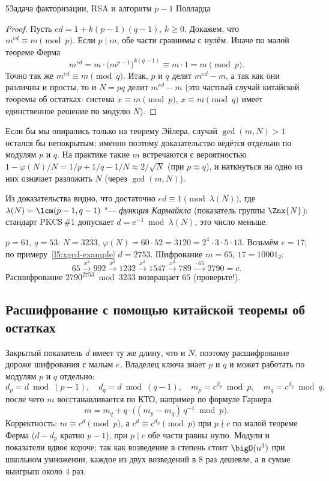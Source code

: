 \begin{lecture}{5}{Задача факторизации, RSA и алгоритм \texorpdfstring{$p - 1$}{p - 1} Полларда}
\begin{proof}
Пусть $ed = 1 + k(p - 1)(q - 1)$, $k \ge 0$. Докажем, что $m^{ed} \equiv m \pmod p$. Если
$p \mid m$, обе части сравнимы с нулём. Иначе по малой теореме Ферма
\[
  m^{ed} = m \cdot \bigl(m^{p-1}\bigr)^{k(q-1)} \equiv m \cdot 1 = m \pmod p.
\]
Точно так же $m^{ed} \equiv m \pmod q$. Итак, $p$ и $q$ делят $m^{ed} - m$, а так как они
различны и просты, то и $N = pq$ делит $m^{ed} - m$ (это частный случай китайской теоремы об
остатках: система $x \equiv m \pmod p$, $x \equiv m \pmod q$ имеет единственное решение по
модулю $N$).
\end{proof}

Если бы мы опирались только на теорему Эйлера, случай $\gcd(m, N) > 1$ остался бы
непокрытым; именно поэтому доказательство ведётся отдельно по модулям $p$ и $q$.
На практике такие $m$ встречаются с вероятностью $1 - \varphi(N)/N = 1/p + 1/q - 1/N \approx 2/\sqrt N$ (при $p \approx q$), и
наткнуться на одно из них означает разложить $N$ (через $\gcd(m, N)$).

\begin{remark}
Из доказательства видно, что достаточно $ed \equiv 1 \pmod{\lambda(N)}$, где
$\lambda(N) = \lcm(p - 1, q - 1)$ "--- \emph{функция Кармайкла} (показатель группы $\Znx{N}$):
стандарт PKCS\,\#1 допускает $d = e^{-1} \bmod \lambda(N)$, это число меньше.
\end{remark}

\begin{example}\label{l5:rsa-hand}
$p = 61$, $q = 53$: $N = 3233$, $\varphi(N) = 60 \cdot 52 = 3120 = 2^4 \cdot 3 \cdot 5 \cdot 13$.
Возьмём $e = 17$; по примеру~\ref{l5:xgcd-example} $d = 2753$. Шифрование $m = 65$, $17 = 10001_2$:
\[
  65 \xrightarrow{\,x^2\,} 992 \xrightarrow{\,x^2\,} 1232 \xrightarrow{\,x^2\,} 1547
  \xrightarrow{\,x^2\,} 789 \xrightarrow{\,\cdot 65\,} 2790 = c.
\]
Расшифрование $2790^{2753} \bmod 3233$ возвращает $65$ (проверьте!).
\end{example}

\subsection{Расшифрование с помощью китайской теоремы об остатках}

Закрытый показатель $d$ имеет ту же длину, что и $N$, поэтому расшифрование дороже
шифрования с малым $e$. Владелец ключа знает $p$ и $q$ и может работать по модулям $p$ и $q$
отдельно:
\[
  d_p = d \bmod (p - 1), \quad d_q = d \bmod (q - 1), \quad
  m_p = c^{d_p} \bmod p, \quad m_q = c^{d_q} \bmod q,
\]
после чего $m$ восстанавливается по КТО, например по формуле Гарнера
\[
  m = m_q + q \cdot \bigl((m_p - m_q)\, q^{-1} \bmod p\bigr).
\]
Корректность: $m \equiv c^d \pmod p$, а $c^d \equiv c^{d_p} \pmod p$ при $p \nmid c$ по малой
теореме Ферма ($d - d_p$ кратно $p - 1$), при $p \mid c$ обе части равны нулю. Модули и
показатели вдвое короче; так как возведение в степень стоит $\bigO(n^3)$ при школьном умножении,
каждое из двух возведений в $8$ раз дешевле, а в сумме выигрыш около $4$ раз.


\end{lecture}
